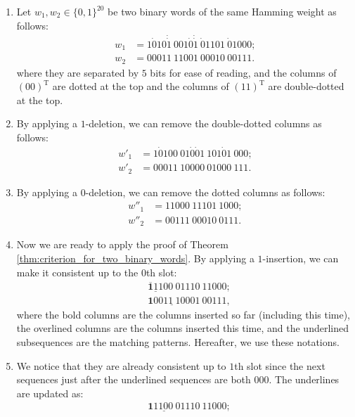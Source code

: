 \documentclass{article}
\theoremstyle{definition}
\newcommand{\bin}{\{0,1\}}
\begin{document}
    \begin{enumerate}
    \item Let $w_1, w_2 \in \bin^{20}$ be two binary words of the same Hamming weight as follows:
    \[
        \begin{split}
            w_1 &= 1\dot{0}10\dot{\dot{1}}\ 001\dot{0}\dot{\dot{1}}\ \dot{0}1101\ \dot{0}1000; \\
            w_2 &= 00011\ 11001\ 00010\ 00111.
        \end{split}
    \]
    where they are separated by $5$ bits for ease of reading, and the columns of $(00)^{\mathrm{T}}$ are dotted at the top and the columns of $(11)^{\mathrm{T}}$ are double-dotted at the top.
    \item By applying a $1$-deletion, we can remove the double-dotted columns as follows:
    \[
        \begin{split}
            w'_1 &= 1\dot{0}100\ 01\dot{0}\dot{0}1\ 101\dot{0}1\ 000; \\
            w'_2 &= 00011\ 10000\ 01000\ 111.
        \end{split}
    \]
    \item By applying a $0$-deletion, we can remove the dotted columns as follows:
    \[
        \begin{split}
            w''_1 &= 11000\ 11101\ 1000; \\
            w''_2 &= 00111\ 00010\ 0111.
        \end{split}
    \]
    \item Now we are ready to apply the proof of Theorem \ref{thm:criterion_for_two_binary_words}. By applying a $1$-insertion, we can make it consistent up to the $0$th slot:
    \[
        \begin{split}
            &\underline{\overline{\mathbf{1}}11}00\ 01110\ 11000; \\
            &\mathbf{1}00\underline{11\ 1}0001\ 00111,
        \end{split}
    \]
    where the bold columns are the columns inserted so far (including this time), the overlined columns are the columns inserted this time, and the underlined subsequences are the matching patterns. Hereafter, we use these notations.
    \item We notice that they are already consistent up to $1$th slot since the next sequences just after the underlined sequences are both $000$. 
    The underlines are updated as:
    \[
        \begin{split}
            &\underline{\mathbf{1}1100\ 0}1110\ 11000; \\

\end{split}\]
\end{enumerate}
\end{document}
